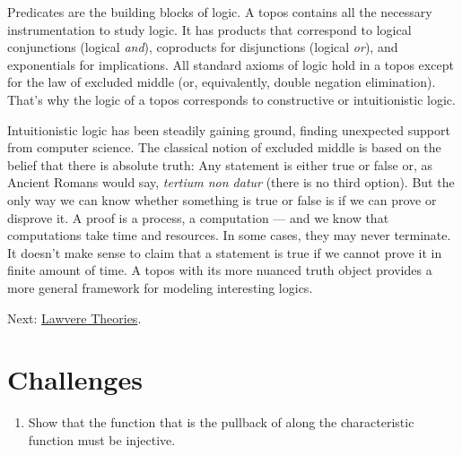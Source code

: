 Predicates are the building blocks of logic. A topos contains all the
necessary instrumentation to study logic. It has products that
correspond to logical conjunctions (logical \emph{and}), coproducts for
disjunctions (logical \emph{or}), and exponentials for implications. All
standard axioms of logic hold in a topos except for the law of excluded
middle (or, equivalently, double negation elimination). That's why the
logic of a topos corresponds to constructive or intuitionistic logic.

Intuitionistic logic has been steadily gaining ground, finding
unexpected support from computer science. The classical notion of
excluded middle is based on the belief that there is absolute truth: Any
statement is either true or false or, as Ancient Romans would say,
\emph{tertium non datur} (there is no third option). But the only way we
can know whether something is true or false is if we can prove or
disprove it. A proof is a process, a computation --- and we know that
computations take time and resources. In some cases, they may never
terminate. It doesn't make sense to claim that a statement is true if we
cannot prove it in finite amount of time. A topos with its more nuanced
truth object provides a more general framework for modeling interesting
logics.

Next:
\href{https://bartoszmilewski.com/2017/08/26/lawvere-theories/}{Lawvere
Theories}.

\section{Challenges}\label{challenges}

\begin{enumerate}
\tightlist
\item
  Show that the function  that is the pullback of
   along the characteristic function must be injective.
\end{enumerate}
